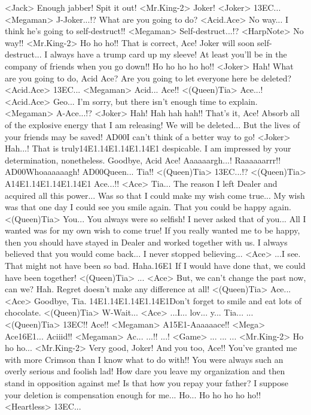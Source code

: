 <Jack> Enough jabber! Spit it out! 
<Mr.King-2> Joker! 
<Joker> {13}{EC}... 
<Megaman> J-Joker...!? 
What are you going to do? 
<Acid.Ace> No way... 
I think he's going to self-destruct!! 
<Megaman> Self-destruct...!? 
<HarpNote> No way!! 
<Mr.King-2> Ho ho ho!! 
That is correct, Ace! 
Joker will soon self-destruct... 
I always have a trump card up my sleeve! 
At least you'll be in the company of friends when you go down!! 
Ho ho ho ho ho!! 
<Joker> Hah! 
What are you going to do, Acid Ace? 
Are you going to let everyone here be deleted? 
<Acid.Ace> {13}{EC}... 
<Megaman> Acid... 
Ace!! 
<(Queen)Tia> Ace...! 
<Acid.Ace> Geo... 
I'm sorry, but there isn't enough time to explain. 
<Megaman> A-Ace...!? 
<Joker> Hah! 
Hah hah hah!! 
That's it, Ace! 
Absorb all of the explosive energy that I am releasing! 
We will be deleted... 
But the lives of your friends may be saved! 
{AD}{00}I can't think of a better way to go! 
<Joker> Hah...! 
That is truly{14}{E1}.{14}{E1}.{14}{E1}.{14}{E1} despicable. 
I am impressed by your determination, nonetheless. 
Goodbye, Acid Ace! 
Aaaaaargh...! Raaaaaarrr!! 
{AD}{00}Whoaaaaaagh! 
{AD}{00}Queen... Tia!! 
<(Queen)Tia> {13}{EC}...!? 
<(Queen)Tia> A{14}{E1}.{14}{E1}.{14}{E1}.{14}{E1} Ace...!! 
<Ace> Tia... 
The reason I left Dealer and acquired all this power... 
Was so that I could make my wish come true... 
My wish was that one day I could see you smile again. 
That you could be happy again. 
<(Queen)Tia> You... You always were so selfish! 
I never asked that of you... 
All I wanted was for my own wish to come true! 
If you really wanted me to be happy, then you should 
have stayed in Dealer and worked together with us. 
I always believed that you would come back... 
I never stopped believing... 
<Ace> ...I see. 
That might not have been so bad. 
Haha.{16}{E1} If I would have done that, we could have been together! 
<(Queen)Tia> ... 
<Ace> But, we can't change the past now, can we? 
Hah. Regret doesn't make any difference at all! 
<(Queen)Tia> Ace... 
<Ace> Goodbye, Tia. 
{14}{E1}.{14}{E1}.{14}{E1}.{14}{E1}Don't forget to smile and eat lots of chocolate. 
<(Queen)Tia> W-Wait... 
<Ace> ...I... lov... y... 
Tia... ... 
<(Queen)Tia> {13}{EC}!! 
Ace!! 
<Megaman> A{15}{E1}-Aaaaaace!! 
<Mega> Ace{16}{E1}... Aciiid!! 
<Megaman> Ac... 
...!! 
...! 
<Game> ... 
... 
... 
<Mr.King-2> Ho ho ho... 
<Mr.King-2> Very good, Joker! 
And you too, Ace!! 
You've granted me with more Crimson than I know what to do with!! 
You were always such an overly serious and foolish lad! 
How dare you leave my organization and then stand in opposition against me! 
Is that how you repay your father? 
I suppose your deletion is compensation enough for me... 
Ho... Ho ho ho ho ho!! 
<Heartless> {13}{EC}... 
